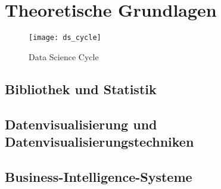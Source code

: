 \chapter{Theoretische Grundlagen}

\begin{figure}[h]
    \centering
        \texttt{[image: ds\_cycle]}
        \caption{Data Science Cycle}
        \label{fig:data science}
\end{figure}




\section{Bibliothek und Statistik}
\section{Datenvisualisierung und Datenvisualisierungstechniken}
\section{Business-Intelligence-Systeme}